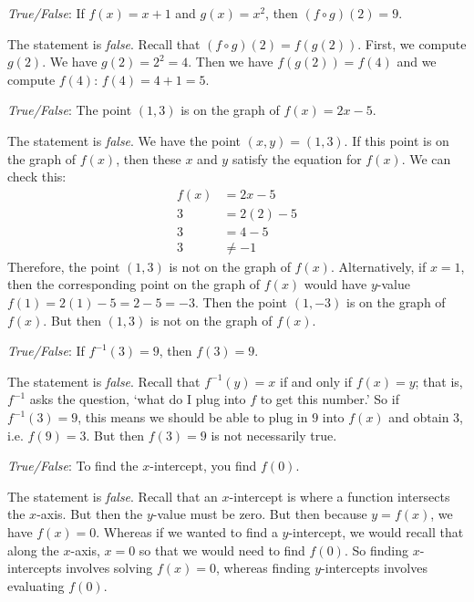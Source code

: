 \documentclass[11pt,letterpaper]{article}
\begin{document}
\quizsol \textit{True/False}: If $f(x)= x + 1$ and $g(x)= x^2$, then $(f \circ g)(2)= 9$. \pspace

\sol The statement is \textit{false}. Recall that $(f \circ g)(2)= f(g(2))$. First, we compute $g(2)$. We have $g(2)= 2^2= 4$. Then we have $f(g(2))= f(4)$ and we compute $f(4)$: $f(4)= 4 +1= 5$. \pvspace{1.5cm}



\newpage



\quizsol \textit{True/False}: The point $(1, 3)$ is on the graph of $f(x)= 2x - 5$. \pspace

\sol The statement is \textit{false}. We have the point $(x, y)= (1, 3)$. If this point is on the graph of $f(x)$, then these $x$ and $y$ satisfy the equation for $f(x)$. We can check this:
	\[
	\begin{aligned}
	f(x)&= 2x - 5 \\
	3&= 2(2) - 5 \\
	3&= 4 - 5 \\
	3&\neq -1
	\end{aligned}
	\]
Therefore, the point $(1, 3)$ is not on the graph of $f(x)$. Alternatively, if $x= 1$, then the corresponding point on the graph of $f(x)$ would have $y$-value $f(1)= 2(1) - 5= 2 - 5= -3$. Then the point $(1, -3)$ is on the graph of $f(x)$. But then $(1, 3)$ is not on the graph of $f(x)$. \pvspace{1.5cm}



\quizsol \textit{True/False}: If $f^{-1}(3)= 9$, then $f(3)= 9$. \pspace

\sol The statement is \textit{false}. Recall that $f^{-1}(y)= x$ if and only if $f(x)= y$; that is, $f^{-1}$ asks the question, `what do I plug into $f$ to get this number.' So if $f^{-1}(3)= 9$, this means we should be able to plug in $9$ into $f(x)$ and obtain $3$, i.e. $f(9)= 3$. But then $f(3)= 9$ is not necessarily true. \pvspace{1.5cm}



\quizsol \textit{True/False}: To find the $x$-intercept, you find $f(0)$. \pspace

\sol The statement is \textit{false}. Recall that an $x$-intercept is where a function intersects the $x$-axis. But then the $y$-value must be zero. But then because $y= f(x)$, we have $f(x)= 0$. Whereas if we wanted to find a $y$-intercept, we would recall that along the $x$-axis, $x= 0$ so that we would need to find $f(0)$. So finding $x$-intercepts involves solving $f(x)= 0$, whereas finding $y$-intercepts involves evaluating $f(0)$. \pvspace{1.5cm} 
\end{document}
